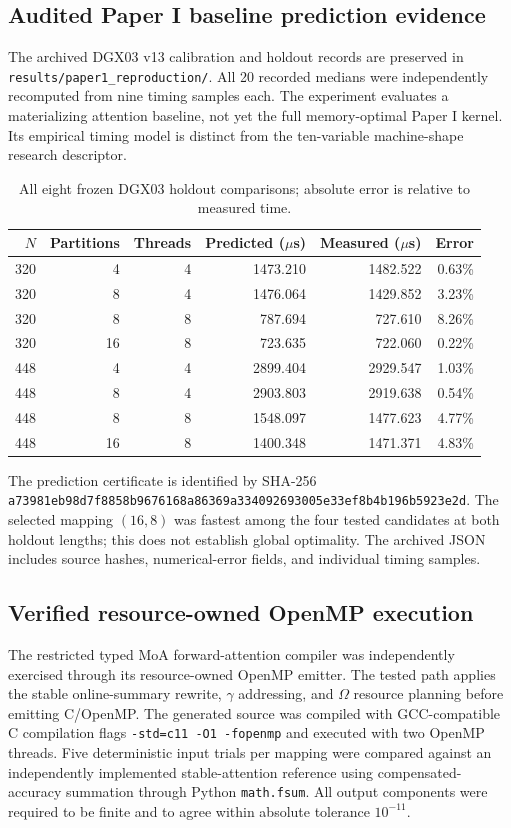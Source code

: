 \documentclass[11pt]{article}
\begin{document}
\subsection{Audited Paper I baseline prediction evidence}
The archived DGX03 v13 calibration and holdout records are preserved in \texttt{results/paper1\_reproduction/}. All 20 recorded medians were independently recomputed from nine timing samples each. The experiment evaluates a materializing attention baseline, not yet the full memory-optimal Paper I kernel. Its empirical timing model is distinct from the ten-variable machine-shape research descriptor.
\begin{table}[htbp]\centering\small
\caption{All eight frozen DGX03 holdout comparisons; absolute error is relative to measured time.}
\begin{tabular}{rrrrrr}\toprule $N$ & Partitions & Threads & Predicted ($\mu$s) & Measured ($\mu$s) & Error \\ \midrule
320 & 4 & 4 & 1473.210 & 1482.522 & 0.63\% \\
320 & 8 & 4 & 1476.064 & 1429.852 & 3.23\% \\
320 & 8 & 8 & 787.694 & 727.610 & 8.26\% \\
320 & 16 & 8 & 723.635 & 722.060 & 0.22\% \\
448 & 4 & 4 & 2899.404 & 2929.547 & 1.03\% \\
448 & 8 & 4 & 2903.803 & 2919.638 & 0.54\% \\
448 & 8 & 8 & 1548.097 & 1477.623 & 4.77\% \\
448 & 16 & 8 & 1400.348 & 1471.371 & 4.83\% \\
\bottomrule\end{tabular}\end{table}
The prediction certificate is identified by SHA-256 \texttt{a73981eb98d7f8858b9676168a86369a334092693005e33ef8b4b196b5923e2d}. The selected mapping $(16,8)$ was fastest among the four tested candidates at both holdout lengths; this does not establish global optimality. The archived JSON includes source hashes, numerical-error fields, and individual timing samples.
\subsection{Verified resource-owned OpenMP execution}
The restricted typed MoA forward-attention compiler was independently exercised through its resource-owned OpenMP emitter. The tested path applies the stable online-summary rewrite, $\gamma$ addressing, and $\Omega$ resource planning before emitting C/OpenMP. The generated source was compiled with GCC-compatible C compilation flags \texttt{-std=c11 -O1 -fopenmp} and executed with two OpenMP threads. Five deterministic input trials per mapping were compared against an independently implemented stable-attention reference using compensated-accuracy summation through Python \texttt{math.fsum}. All output components were required to be finite and to agree within absolute tolerance $10^{-11}$.
\end{document}
